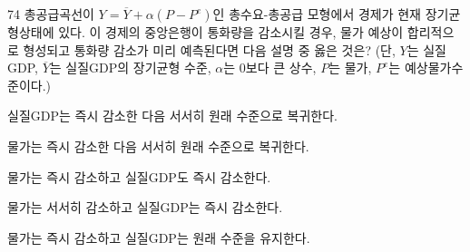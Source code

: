 \begin{question}{74}
총공급곡선이 $Y = \overline{ Y } + \alpha (P-P^{ e } )$인 총수요-총공급 모형에서 경제가 현재 장기균형상태에 있다. 이 경제의 중앙은행이 통화량을 감소시킬 경우, 물가 예상이 합리적으로 형성되고 통화량 감소가 미리 예측된다면 다음 설명 중 옳은 것은? (단, $Y$는 실질GDP, $\overline{ Y }$는 실질GDP의 장기균형 수준, $\alpha$는 0보다 큰 상수, $P$는 물가, $P^{ e }$는 예상물가수준이다.)
\begin{choices}
  \item 실질GDP는 즉시 감소한 다음 서서히 원래 수준으로 복귀한다.
  \item 물가는 즉시 감소한 다음 서서히 원래 수준으로 복귀한다.
  \item 물가는 즉시 감소하고 실질GDP도 즉시 감소한다.
  \item 물가는 서서히 감소하고 실질GDP는 즉시 감소한다.
  \item 물가는 즉시 감소하고 실질GDP는 원래 수준을 유지한다.
\end{choices}
\end{question}
